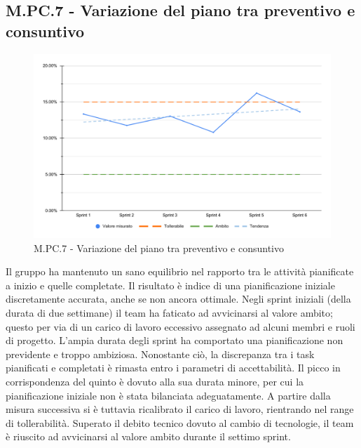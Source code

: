 \subsection{M.PC.7 - Variazione del piano tra preventivo e consuntivo}
\begin{figure}[H]
    \centering
    \includegraphics[width=\textwidth]{assets/variazione_task_completati.pdf}
    \caption{M.PC.7 - Variazione del piano tra preventivo e consuntivo}
\end{figure}

\par Il gruppo ha mantenuto un sano equilibrio nel rapporto tra le attività pianificate a inizio  e quelle completate. Il risultato è indice di una pianificazione iniziale discretamente accurata, anche se non ancora ottimale. Negli sprint iniziali (della durata di due settimane) il team ha faticato ad avvicinarsi al valore ambito; questo per via di un carico di lavoro eccessivo assegnato ad alcuni membri e ruoli di progetto. L’ampia durata degli sprint ha comportato una pianificazione non previdente e troppo ambiziosa. Nonostante ciò, la discrepanza tra i task pianificati e completati è rimasta entro i parametri di accettabilità. Il picco in corrispondenza del quinto  è dovuto alla sua durata minore, per cui la pianificazione iniziale non è stata bilanciata adeguatamente. A partire dalla misura successiva si è tuttavia ricalibrato il carico di lavoro, rientrando nel range di tollerabilità. Superato il debito tecnico dovuto al cambio di tecnologie, il team è riuscito ad avvicinarsi al valore ambito durante il settimo sprint.
